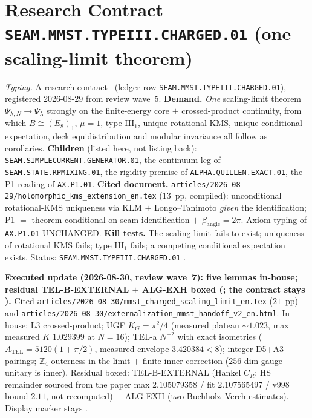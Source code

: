 \documentclass[11pt,a4paper]{article}
\begin{document}
\section*{Research Contract --- \texttt{SEAM.MMST.TYPEIII.CHARGED.01} (one scaling-limit theorem)}
\noindent\emph{Typing.} A research contract \mO\ (ledger row
\texttt{SEAM.MMST.TYPEIII.CHARGED.01}), registered 2026-08-29 from review wave~5.
\textbf{Demand.}  \emph{One} scaling-limit theorem $\Psi_{\lambda,N}\to\Psi_\lambda$ strongly on
the finite-energy core $+$ crossed-product continuity, from which $B\cong(E_8)_1$, $\mu=1$,
type III$_1$, unique rotational KMS, unique conditional expectation, deck equidistribution and
modular invariance all follow as corollaries.  \textbf{Children} (listed here, not listing back):
\texttt{SEAM.SIMPLECURRENT.GENERATOR.01}, the continuum leg of \texttt{SEAM.STATE.RPMIXING.01},
the rigidity premise of \texttt{ALPHA.QUILLEN.EXACT.01}, the P1 reading of \texttt{AX.P1.01}.
\textbf{Cited document.}
\texttt{articles/2026-08-29/holomorphic\_kms\_extension\_en.tex} ($13$~pp, compiled):
unconditional rotational-KMS uniqueness via KLM $+$ Longo--Tanimoto \emph{given} the
identification; P1 $=$ theorem-conditional on seam identification $+$ $\beta_{\mathrm{angle}}=2\pi$.
Axiom typing of \texttt{AX.P1.01} UNCHANGED.  \textbf{Kill tests.}  The scaling limit fails to
exist; uniqueness of rotational KMS fails; type III$_1$ fails; a competing conditional
expectation exists.  Status: \texttt{SEAM.MMST.TYPEIII.CHARGED.01} \mO.

\par\smallskip\noindent\textbf{Executed update (2026-08-30, review wave~7): five lemmas
in-house; residual TEL-B-EXTERNAL $+$ ALG-EXH boxed
(; the contract stays \mO).}
Cited \texttt{articles/2026-08-30/\allowbreak mmst\_\allowbreak charged\_\allowbreak scaling\_\allowbreak limit\_\allowbreak en.tex} ($21$~pp) and
\texttt{articles/2026-08-30/\allowbreak externalization\_\allowbreak mmst\_\allowbreak handoff\_\allowbreak v2\_\allowbreak en.html}.
In-house: L3 crossed-product; UGF $K_G=\pi^2/4$ (measured plateau $\sim1.023$, max measured $K$
$1.029399$ at $N=16$); TEL-a $N^{-2}$ with exact isometries
($A_{\mathrm{TEL}}=5120(1+\pi/2)$, measured envelope $3.420384<8$);
integer D5+A3 pairings; $\mathbb Z_4$ outerness in the limit $+$ finite-inner correction
($256$-dim gauge unitary is inner).  Residual boxed: TEL-B-EXTERNAL (Hankel $C_R$; HS remainder
sourced from the paper max $2.105079358$ / fit $2.107565497$ / v998 bound $2.11$, not
recomputed) $+$ ALG-EXH (two Buchholz--Verch estimates).  Display marker stays \mO.
\end{document}

